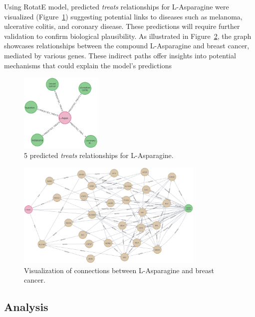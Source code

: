 Using RotatE model, predicted \textit{treats} relationships for L-Asparagine were visualized (Figure~\ref{fig:predicted_treats}) suggesting potential links to diseases such as melanoma, ulcerative colitis, and coronary disease. These predictions will require further validation to confirm biological plausibility. As illustrated in Figure~\ref{fig:kg_visualization}, the graph showcases relationships between the compound L-Asparagine and breast cancer, mediated by various genes. These indirect paths offer insights into potential mechanisms that could explain the model's predictions

\begin{figure}[h]
    \centering
    \includegraphics[width=0.35\textwidth]{images/pykeen/predicted treats}
    \caption{5 predicted \textit{treats} relationships for L-Asparagine.}
    \label{fig:predicted_treats}
\end{figure}

\begin{figure}[h]
    \centering
    \includegraphics[width=0.8\textwidth]{images/pykeen/results}
    \caption{Visualization of connections between L-Asparagine and breast cancer.}
    \label{fig:kg_visualization}
\end{figure}

\subsection*{Analysis}

